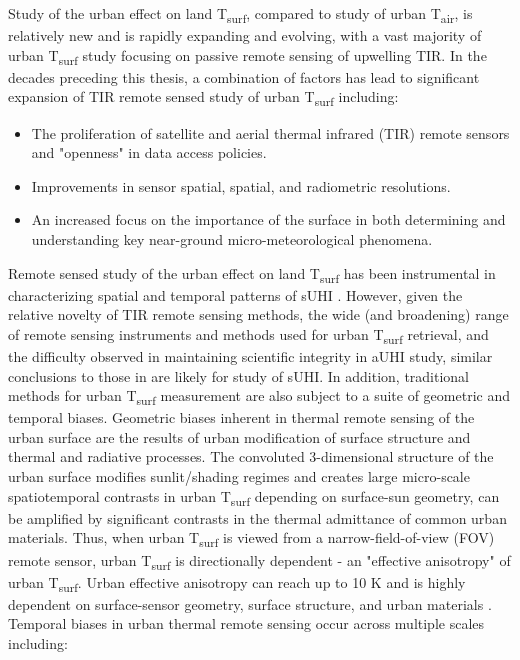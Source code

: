 Study of the urban effect on land T\textsubscript{surf}, compared to study of urban T\textsubscript{air}, is relatively new and is rapidly expanding and evolving, with a vast majority of urban T\textsubscript{surf} study focusing on passive remote sensing of upwelling TIR. In the decades preceding this thesis, a combination of factors has lead to significant expansion of TIR remote sensed study of urban T\textsubscript{surf} including: 

\begin{itemize}
	\item The proliferation of satellite and aerial thermal infrared (TIR) remote sensors and "openness" in data access policies.
	\item Improvements in sensor spatial, spatial, and radiometric resolutions. 
	\item An increased focus on the importance of the surface in both determining and understanding key near-ground micro-meteorological phenomena.
\end{itemize}

Remote sensed study of the urban effect on land T\textsubscript{surf} has been instrumental in characterizing spatial and temporal patterns of sUHI \citep{Peng2012, Streutker2003, Imhoff2010}. However, given the relative novelty of TIR remote sensing methods, the wide (and broadening) range of remote sensing instruments and methods used for urban T\textsubscript{surf} retrieval, and the difficulty observed in maintaining scientific integrity in aUHI study, similar conclusions to those in \citet{Stewart2011} are likely for study of sUHI. In addition, traditional methods for urban T\textsubscript{surf} measurement are also subject to a suite of geometric and temporal biases. Geometric biases inherent in thermal remote sensing of the urban surface are the results of urban modification of surface structure and thermal and radiative processes. The convoluted 3-dimensional structure of the urban surface modifies sunlit/shading regimes and creates large micro-scale spatiotemporal contrasts in urban T\textsubscript{surf} depending on surface-sun geometry, can be amplified by significant contrasts in the thermal admittance of common urban materials. Thus, when urban T\textsubscript{surf} is viewed from a narrow-field-of-view (FOV) remote sensor, urban T\textsubscript{surf} is directionally dependent - an "effective anisotropy" of urban T\textsubscript{surf}. Urban effective anisotropy can reach up to 10 \si{\kelvin} and is highly dependent on surface-sensor geometry, surface structure, and urban materials \citep{Krayenhoff2016, Voogt1997}. Temporal biases in urban thermal remote sensing occur across multiple scales including: 

